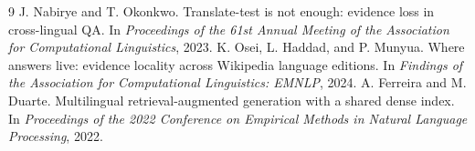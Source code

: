\documentclass[10pt,twocolumn]{article}
\begin{document}
\begin{thebibliography}{9}
 J. Nabirye and T. Okonkwo.
Translate-test is not enough: evidence loss in cross-lingual QA.
In \textit{Proceedings of the 61st Annual Meeting of the Association for Computational Linguistics}, 2023.
 K. Osei, L. Haddad, and P. Munyua.
Where answers live: evidence locality across Wikipedia language editions.
In \textit{Findings of the Association for Computational Linguistics: EMNLP}, 2024.
 A. Ferreira and M. Duarte.
Multilingual retrieval-augmented generation with a shared dense index.
In \textit{Proceedings of the 2022 Conference on Empirical Methods in Natural Language Processing}, 2022.
\end{thebibliography}
\end{document}
